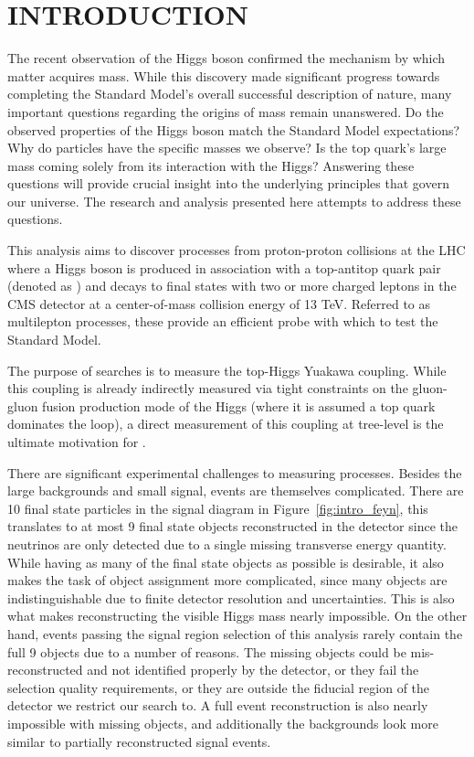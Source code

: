 %
%

\chapter{INTRODUCTION}
The recent observation of the Higgs boson confirmed the mechanism by which matter acquires mass. While this discovery made
significant progress towards completing the Standard Model's overall successful description of nature, many important questions
regarding the origins of mass remain unanswered. Do the observed properties of the Higgs boson match the Standard Model expectations? Why do
particles have the specific masses we observe? Is the top quark's large mass coming solely from its interaction with the Higgs?
Answering these questions will provide crucial insight into the underlying principles that govern our universe. The research and
analysis presented here attempts to address these questions. 

This analysis aims to discover processes from proton-proton collisions at the LHC where a Higgs boson is produced in association
with a top-antitop quark pair (denoted as \tth) and decays to final states with two or more charged leptons in the CMS detector
at a center-of-mass collision energy of 13 TeV.
Referred to as \tth multilepton processes, these provide an efficient probe with which to test the Standard Model. 

The purpose of \tth searches is to measure the top-Higgs Yuakawa coupling. While this coupling is already indirectly measured via tight constraints
on the gluon-gluon fusion production mode of the Higgs (where it is assumed a top quark dominates the loop), a direct measurement of this coupling
at tree-level is the ultimate motivation for \tth. 

There are significant experimental challenges to measuring \tth processes. Besides the large backgrounds and small signal, \tth events are themselves
complicated. There are 10 final state particles in the signal diagram in Figure~\ref{fig:intro_feyn}, this translates to at most 9 final state objects
reconstructed in the detector since the neutrinos are only detected due to a single missing transverse energy quantity. While having as many of the final
state objects as possible is desirable, it also makes the task of object assignment more complicated, since many objects are indistinguishable due to
finite detector resolution and uncertainties. This is also what makes reconstructing the visible Higgs mass nearly impossible. On the other hand,
events passing the signal region selection of this analysis rarely contain the full 9 objects due to a number of reasons. The missing objects could be mis-reconstructed
and not identified properly by the detector, or they fail the selection quality requirements, or they are outside the fiducial region of the detector
we restrict our search to. A full event reconstruction is also nearly impossible with missing objects, and additionally the backgrounds look more similar
to partially reconstructed \tth signal events. 

